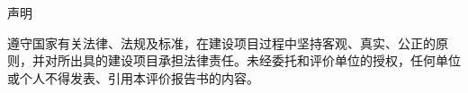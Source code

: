 \clearpage
\thispagestyle{empty}


\thispagestyle{declaration}

\centering
\vspace{10mm}
{\songti \buildunit\project\radiationhazard\reportkind\par}
\vspace{5mm}
{\songti \reportno\par}
\vspace{10mm}

{\heiti 声明\par}
\vspace{5mm}
\songti
\justifying
\company 遵守国家有关法律、法规及标准，在建设项目\radiationhazard\reportkind 过程中坚持客观、真实、公正的原则，并对所出具的建设项目\radiationhazard\reportkind 承担法律责任。未经委托和评价单位的授权，任何单位或个人不得发表、引用本评价报告书的内容。


